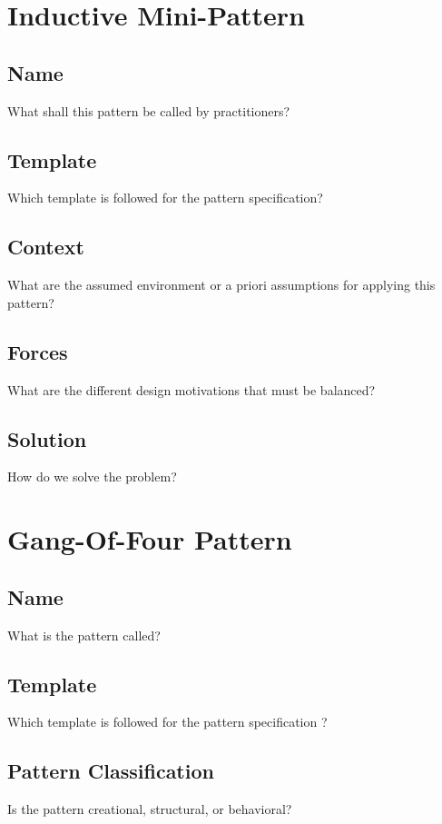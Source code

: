 \documentclass{article}
\begin{document}
\section{Inductive Mini-Pattern}

\subsection{Name}
What shall this pattern be called by practitioners?

\subsection{Template}
Which template is followed for the pattern specification?

\subsection{Context}
What are the assumed environment or a priori assumptions for applying this pattern?

\subsection{Forces}
What are the different design motivations that must be balanced?

\subsection{Solution}
How do we solve the problem?


\section{Gang-Of-Four Pattern}

\subsection{Name}
What is the pattern called?

\subsection{Template}
Which template is followed for the pattern specification ?  

\subsection{Pattern Classification}
Is the pattern creational, structural, or behavioral?
\end{document}
